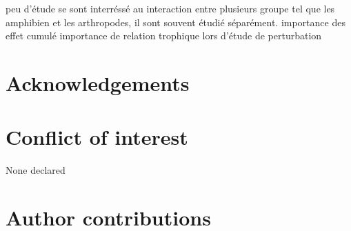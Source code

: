 peu d'étude se sont interréssé au interaction entre plusieurs groupe tel que les amphibien et les arthropodes, il sont souvent étudié séparément.
importance des effet cumulé
importance de relation trophique lors d'étude de perturbation

\section*{Acknowledgements}
\label{sec:acknowl1}

\section*{Conflict of interest}
\label{sec:conflict1}

None declared
\section*{Author contributions}
\label{sec:author1}

\cleardoublepage

\begin{otherlanguage}{english}

\end{otherlanguage}
